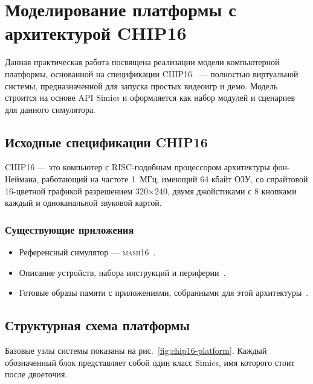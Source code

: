 \chapter{Моделирование платформы с архитектурой CHIP16}\label{chap:lab05}

Данная практическая работа посвящена реализации модели компьютерной платформы, основанной на спецификации CHIP16~\cite{chip16-ngemu} --- полностью виртуальной системы, предназначенной для запуска простых видеоигр и демо. Модель строится на основе API Simics и оформляется как набор модулей и сценариев для данного симулятора.

\section{Исходные спецификации CHIP16}

CHIP16 --- это компьютер с RISC-подобным процессором архитектуры фон-Неймана, работающий на частоте 1~МГц, имеющий 64 кбайт ОЗУ, со спрайтовой 16-цветной графикой разрешением 320×240, двумя джойстиками с 8 кнопками каждый и одноканальной звуковой картой.

\subsection{Существующие приложения}

\begin{itemize}
    \item Референсный симулятор --- \textsc{mash16}~\cite{chip16-mach16}.
    \item Описание устройств, набора инструкций и периферии~\cite{chip16-machspec}.
    \item Готовые образы памяти с приложениями, собранными для этой архитектуры~\cite{chip16-roms}.
\end{itemize}

\section{Структурная схема платформы}

Базовые узлы системы показаны на рис.~\ref{fig:chip16-platform}. Каждый обозначенный блок представляет собой один класс Simics, имя которого стоит после двоеточия.

